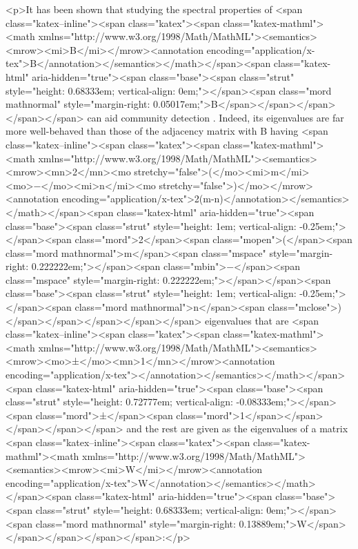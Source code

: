 <p>It has been shown that studying the spectral properties of <span class="katex--inline"><span class="katex"><span class="katex-mathml"><math xmlns="http://www.w3.org/1998/Math/MathML"><semantics><mrow><mi>B</mi></mrow><annotation encoding="application/x-tex">B</annotation></semantics></math></span><span class="katex-html" aria-hidden="true"><span class="base"><span class="strut" style="height: 0.68333em; vertical-align: 0em;"></span><span class="mord mathnormal" style="margin-right: 0.05017em;">B</span></span></span></span></span> can aid community detection \cite{Krzakala20935}. Indeed, its eigenvalues are far more well-behaved than those of the adjacency matrix with B having <span class="katex--inline"><span class="katex"><span class="katex-mathml"><math xmlns="http://www.w3.org/1998/Math/MathML"><semantics><mrow><mn>2</mn><mo stretchy="false">(</mo><mi>m</mi><mo>−</mo><mi>n</mi><mo stretchy="false">)</mo></mrow><annotation encoding="application/x-tex">2(m-n)</annotation></semantics></math></span><span class="katex-html" aria-hidden="true"><span class="base"><span class="strut" style="height: 1em; vertical-align: -0.25em;"></span><span class="mord">2</span><span class="mopen">(</span><span class="mord mathnormal">m</span><span class="mspace" style="margin-right: 0.222222em;"></span><span class="mbin">−</span><span class="mspace" style="margin-right: 0.222222em;"></span></span><span class="base"><span class="strut" style="height: 1em; vertical-align: -0.25em;"></span><span class="mord mathnormal">n</span><span class="mclose">)</span></span></span></span></span> eigenvalues that are <span class="katex--inline"><span class="katex"><span class="katex-mathml"><math xmlns="http://www.w3.org/1998/Math/MathML"><semantics><mrow><mo>±</mo><mn>1</mn></mrow><annotation encoding="application/x-tex"></annotation></semantics></math></span><span class="katex-html" aria-hidden="true"><span class="base"><span class="strut" style="height: 0.72777em; vertical-align: -0.08333em;"></span><span class="mord">±</span><span class="mord">1</span></span></span></span></span> and the rest are given as the eigenvalues of a matrix <span class="katex--inline"><span class="katex"><span class="katex-mathml"><math xmlns="http://www.w3.org/1998/Math/MathML"><semantics><mrow><mi>W</mi></mrow><annotation encoding="application/x-tex">W</annotation></semantics></math></span><span class="katex-html" aria-hidden="true"><span class="base"><span class="strut" style="height: 0.68333em; vertical-align: 0em;"></span><span class="mord mathnormal" style="margin-right: 0.13889em;">W</span></span></span></span></span>:</p>
